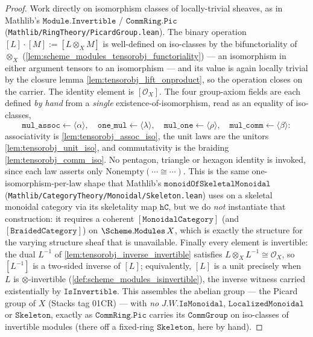 \begin{proof}
  Work directly on isomorphism classes of locally-trivial sheaves, as in Mathlib's
  \(\mathtt{Module.Invertible}\) / \(\mathtt{CommRing.Pic}\)
  (\texttt{Mathlib/RingTheory/PicardGroup.lean}). The binary operation
  \([L]\cdot[M] := [L \otimes_X M]\) is well-defined on iso-classes by the
  bifunctoriality of \(\otimes_X\)
  (\cref{lem:scheme_modules_tensorobj_functoriality}) --- an isomorphism in either
  argument tensors to an isomorphism --- and its value is again locally trivial by
  the closure lemma \cref{lem:tensorobj_lift_onproduct}, so the operation closes on
  the carrier. The identity element is \([\mathcal{O}_X]\). The four group-axiom
  fields are each defined \emph{by hand} from a \emph{single} existence-of-isomorphism,
  read as an equality of iso-classes,
  \[
    \mathtt{mul\_assoc} \leftarrow \langle\alpha\rangle,
    \quad
    \mathtt{one\_mul} \leftarrow \langle\lambda\rangle,
    \quad
    \mathtt{mul\_one} \leftarrow \langle\rho\rangle,
    \quad
    \mathtt{mul\_comm} \leftarrow \langle\beta\rangle:
  \]
  associativity is \cref{lem:tensorobj_assoc_iso}, the unit laws are the unitors
  \cref{lem:tensorobj_unit_iso}, and commutativity is the braiding
  \cref{lem:tensorobj_comm_iso}. No pentagon, triangle or hexagon identity is
  invoked, since each law asserts only \(\mathrm{Nonempty}(\cdots \cong \cdots)\).
  This is the same one-isomorphism-per-law shape that Mathlib's
  \(\mathtt{monoidOfSkeletalMonoidal}\)
  (\texttt{Mathlib/CategoryTheory/Monoidal/Skeleton.lean}) uses on a skeletal
  monoidal category via its skeletality map \(\mathtt{hC}\), but we do \emph{not}
  instantiate that construction: it requires a coherent \([\mathtt{MonoidalCategory}]\)
  (and \([\mathtt{BraidedCategory}]\)) on \(\Scheme.\mathtt{Modules}\,X\), which is
  exactly the structure for the varying structure sheaf that is unavailable.
  Finally every element is invertible: the dual \(L^{-1}\) of
  \cref{lem:tensorobj_inverse_invertible} satisfies \(L \otimes_X L^{-1} \cong
  \mathcal{O}_X\), so \([L^{-1}]\) is a two-sided inverse of \([L]\); equivalently,
  \([L]\) is a unit precisely when \(L\) is \(\otimes\)-invertible
  (\cref{def:scheme_modules_isinvertible}), the inverse witness carried
  existentially by \(\mathtt{IsInvertible}\). This assembles the abelian group ---
  the Picard group of \(X\) (Stacks tag 01CR) --- with \emph{no}
  \(J.W.\mathtt{IsMonoidal}\), \(\mathtt{LocalizedMonoidal}\) or \(\mathtt{Skeleton}\),
  exactly as \(\mathtt{CommRing.Pic}\) carries its \(\mathtt{CommGroup}\) on
  iso-classes of invertible modules (there off a fixed-ring \(\mathtt{Skeleton}\),
  here by hand).


\end{proof}
